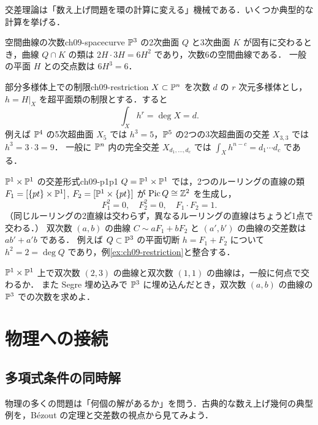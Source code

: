 交差理論は「数え上げ問題を環の計算に変える」機械である．いくつか典型的な計算を挙げる．

\begin{myex}{空間曲線の次数}{ch09-spacecurve}
$\mathbb{P}^3$ の2次曲面 $Q$ と3次曲面 $K$ が固有に交わるとき，曲線 $Q\cap K$ の類は $2H\cdot3H=6H^2$ であり，次数6の空間曲線である．
一般の平面 $H$ との交点数は $6H^3=6$．
\end{myex}

\begin{myex}{部分多様体上での制限}{ch09-restriction}
$X\subset\mathbb{P}^n$ を次数 $d$ の $r$ 次元多様体とし，$h=H|_X$ を超平面類の制限とする．すると
\[
  \int_Xh^r=\deg X=d.
\]
例えば $\mathbb{P}^4$ の5次超曲面 $X_5$ では $h^3=5$，$\mathbb{P}^5$ の2つの3次超曲面の交差 $X_{3,3}$ では $h^3=3\cdot3=9$．
一般に $\mathbb{P}^{n}$ 内の完全交差 $X_{d_1,\dots,d_c}$ では $\int_X h^{n-c}=d_1\cdots d_c$ である．
\end{myex}

\begin{myex}{$\mathbb{P}^1\times\mathbb{P}^1$ の交差形式}{ch09-p1p1}
$Q=\mathbb{P}^1\times\mathbb{P}^1$ では，2つのルーリングの直線の類 $F_1=[\{pt\}\times\mathbb{P}^1]$, $F_2=[\mathbb{P}^1\times\{pt\}]$ が $\operatorname{Pic} Q\cong\mathbb{Z}^2$ を生成し，
\[
  F_1^2=0,\quad F_2^2=0,\quad F_1\cdot F_2=1.
\]
（同じルーリングの2直線は交わらず，異なるルーリングの直線はちょうど1点で交わる．）
双次数 $(a,b)$ の曲線 $C\sim aF_1+bF_2$ と $(a',b')$ の曲線の交差数は $ab'+a'b$ である．
例えば $Q\subset\mathbb{P}^3$ の平面切断 $h=F_1+F_2$ について $h^2=2=\deg Q$ であり，例\ref{ex:ch09-restriction}と整合する．
\end{myex}

$\mathbb{P}^1\times\mathbb{P}^1$ 上で双次数 $(2,3)$ の曲線と双次数 $(1,1)$ の曲線は，一般に何点で交わるか．
また Segre 埋め込みで $\mathbb{P}^3$ に埋め込んだとき，双次数 $(a,b)$ の曲線の $\mathbb{P}^3$ での次数を求めよ．

\section{物理への接続}

\subsection{多項式条件の同時解}

物理の多くの問題は「何個の解があるか」を問う．古典的な数え上げ幾何の典型例を，B\'ezout の定理と交差数の視点から見てみよう．

